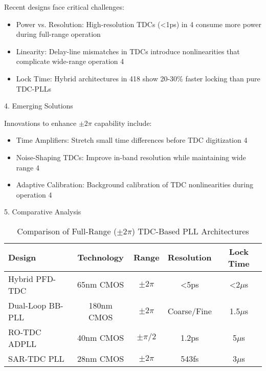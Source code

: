 Recent designs face critical challenges:
    \begin{itemize}
        \item Power vs. Resolution: High-resolution TDCs (<1ps) in 4 consume more power during full-range operation
        \item Linearity: Delay-line mismatches in TDCs introduce nonlinearities that complicate wide-range operation 4
        \item Lock Time: Hybrid architectures in 418 show 20-30\% faster locking than pure TDC-PLLs
    \end{itemize}
    
4. Emerging Solutions

Innovations to enhance $\pm2\pi$ capability include:
    \begin{itemize}
        \item Time Amplifiers: Stretch small time differences before TDC digitization 4
        \item Noise-Shaping TDCs: Improve in-band resolution while maintaining wide range 4
        \item Adaptive Calibration: Background calibration of TDC nonlinearities during operation 4
    \end{itemize}
    
5. Comparative Analysis
\begin{table}[h]
\centering
\caption{Comparison of Full-Range ($\pm2\pi$) TDC-Based PLL Architectures}
\label{tab:tdc_pll_comparison}
\begin{tabular}{lcccc}
\toprule
\textbf{Design} & \textbf{Technology} & \textbf{Range} & \textbf{Resolution} & \textbf{Lock Time} \\
\midrule
Hybrid PFD-TDC \cite{hybrid_patent} & 65nm CMOS & $\pm2\pi$ & <5ps & <2$\mu$s \\
Dual-Loop BB-PLL \cite{dual_loop} & 180nm CMOS & $\pm2\pi$ & Coarse/Fine & 1.5$\mu$s \\
RO-TDC ADPLL \cite{ro_tdc} & 40nm CMOS & $\pm\pi/2$ & 1.2ps & 5$\mu$s \\
SAR-TDC PLL \cite{sar_tdc} & 28nm CMOS & $\pm2\pi$ & 543fs & 3$\mu$s \\
\bottomrule
\end{tabular}
\end{table}
\cite{van1994}